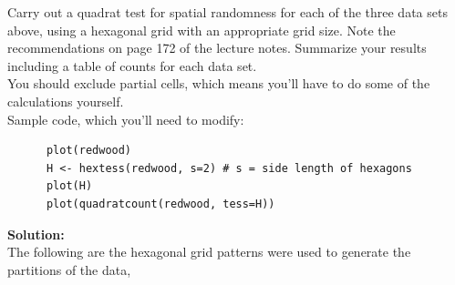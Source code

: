 \documentclass[12pt]{article}
\makeatletter
\theoremstyle{homework}
\newenvironment{exercise}[1]
{\def\@currentlabel{#1}\exercisecore}
{\endexercisecore}
\newcommand{\localhead}[1]{\par\smallskip\noindent\textbf{#1}\nobreak\\}%
\newcommand\solution{\localhead{Solution:}}
\makeatother
\begin{document}
\vspace{.5in}





\begin{exercise}{4} Carry out a quadrat test for spatial randomness for each of the three data sets above, using a hexagonal grid with an appropriate grid size. Note the recommendations on page 172
  of the lecture notes. Summarize your results including a table of counts for each data set.\\
  You should exclude partial cells, which means you'll have to do some of the calculations yourself.\\
  Sample code, which you'll need to modify:\\
  \begin{footnotesize}
    \begin{verbatim}
      plot(redwood)
      H <- hextess(redwood, s=2) # s = side length of hexagons
      plot(H)
      plot(quadratcount(redwood, tess=H))
    \end{verbatim}
    \end{footnotesize}
    \solution The following are the hexagonal grid patterns were used to generate the partitions of the data, 



\end{exercise}
\end{document}
